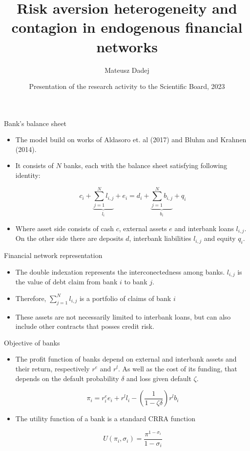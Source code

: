 \documentclass{beamer}
\title{Risk aversion heterogeneity and contagion in
endogenous financial networks}
\author{Mateusz Dadej}
\institute{University of Brescia}
\date[VLC 2023] %
{Presentation of the research activity to the Scientific Board, 2023}
\begin{document}
\begin{frame}{Bank's balance sheet}

    \begin{itemize}
        \item The model build on works of Aldasoro et. al (2017) and Bluhm and Krahnen (2014). %
        \item It consists of $N$ banks, each with the balance sheet satisfying following identity:
        
        \[c_i + \underbrace{\sum_{j=1}^{N}l_{i,j}}_{l_i} + e_i = d_i + \underbrace{\sum_{j=1}^{N}b_{i,j}}_{b_i} + q_i\]

        \item Where asset side consists of cash $c$, external assets $e$ and interbank loans $l_{i,j}$. On the other side there are deposits $d$, interbank liabilities $l_{i,j}$ and equity $q_i$.
        
    \end{itemize}

\end{frame}

\begin{frame}{Financial network representation}

    \begin{itemize}
        \item The double indexation represents the interconectedness among banks. $l_{i,j}$ is the value of debt claim from bank $i$ to bank $j$.
        \item Therefore, $\sum_{j=1}^{N}l_{i,j}$ is a portfolio of claims of bank $i$
        \item These assets are not necessarily limited to interbank loans, but can also include other contracts that posses credit risk.
    \end{itemize}   

\end{frame}

\begin{frame}{Objective of banks}

    \begin{itemize}
        \item The profit function of banks depend on external and interbank assets and their return, respectively $r^e$ and $r^l$. As well as the cost of its funding, that depends on the default probability $\delta$ and loss given default $\zeta$.
        
        \[\pi_i = r_{i}^e e_i + r^l l_i - \left(\frac{1}{1 - \zeta \delta}\right) r^l b_i\]

        \item The utility function of a bank is a standard CRRA function
        
        \[U(\pi_i, \sigma_i) = \frac{\pi^{1-\sigma_i}}{1 - \sigma_i}\]


    \end{itemize}
    
\end{frame}
\end{document}
